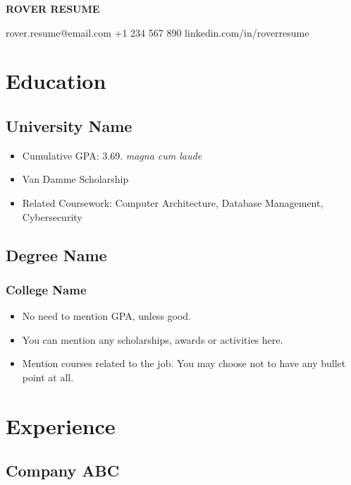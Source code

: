 \documentclass[11pt]{article}
\begin{document}
\begin{center}
  {\Huge\bfseries\uppercase{Rover Resume}} \\ \medskip

  rover.resume@email.com \quad
  +1 234 567 890 \quad
  linkedin.com/in/roverresume
\end{center}


\section{Education}
\subsection{University Name  }
\begin{itemize}
	\item Cumulative GPA: 3.69. \textit{magna cum laude} 
	\item Van Damme Scholarship
  \item Related Coursework: Computer Architecture, Database Management, Cybersecurity
\end{itemize}

\subsection{Degree Name }
\subsubsection{College Name }
\begin{itemize}
	\item No need to mention GPA, unless good.
	\item You can mention any scholarships, awards or activities here.
  \item Mention courses related to the job. You may choose not to have any bullet point at all.
\end{itemize}


\section{Experience}
\subsection{Company ABC }
\end{document}
